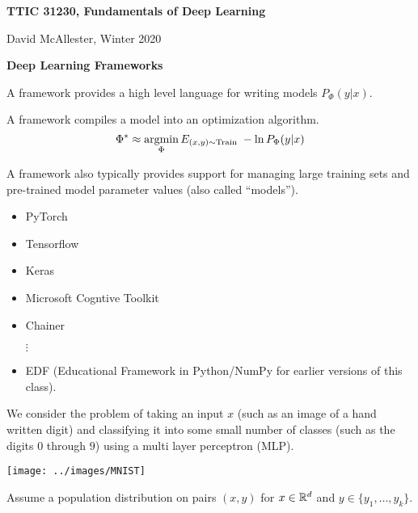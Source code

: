 




{\Huge
  
  \centerline{\bf TTIC 31230, Fundamentals of Deep Learning}
  \bigskip
  \centerline{David McAllester, Winter 2020}
  \vfill
  \vfill
  \centerline{\bf Deep Learning Frameworks}
  \vfill
  \vfill


A framework provides a high level language for writing models $P_\Phi(y|x)$.

\vfill
A framework compiles a model into an optimization algorithm.
\vfill
{\color{red} $$\Phi^* \approx \operatorname*{argmin}_\Phi E_{(x,y) \sim \mathrm{Train}} \; -\ln P_\Phi(y|x)$$}

\vfill
A framework also typically provides support for managing large training sets and pre-trained model parameter values (also called ``models'').



\begin{itemize}

\item PyTorch

\vfill
\item Tensorflow

\vfill
\item Keras

\vfill
\item Microsoft Cogntive Toolkit

\vfill
\item Chainer

$\vdots$

\item EDF (Educational Framework in Python/NumPy for earlier versions of this class).
\end{itemize}


We consider the problem of taking an input $x$ (such as an image of a hand written digit) and classifying it into some small number of classes (such as the digits $0$ through $9$)
using a multi layer perceptron (MLP).

\vfill
\centerline{\texttt{[image: ../images/MNIST]}}
  

Assume a population distribution on pairs $(x,y)$ for $x \in \mathbb{R}^d$ and $y \in \{y_1,\ldots, y_k\}$.

}
